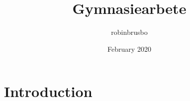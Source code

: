 \documentclass{article}
\title{Gymnasiearbete}
\author{robinbrusbo }
\date{February 2020}
\begin{document}
\maketitle

\section{Introduction}
\end{document}
